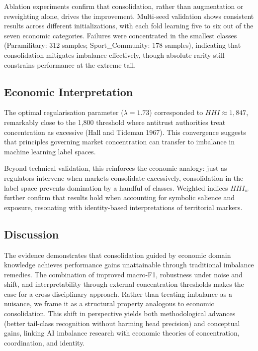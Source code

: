 \documentclass[
  a4paper,
]{article}
\begin{document}
Ablation experiments confirm that consolidation, rather than
augmentation or reweighting alone, drives the improvement. Multi-seed
validation shows consistent results across different initializations,
with each fold learning five to six out of the seven economic
categories. Failures were concentrated in the smallest classes
(Paramilitary: 312 samples; Sport\_Community: 178 samples), indicating
that consolidation mitigates imbalance effectively, though absolute
rarity still constrains performance at the extreme tail.

\subsection{Economic Interpretation}\label{economic-interpretation}

The optimal regularisation parameter (\(\lambda = 1.73\)) corresponded
to \(HHI \approx 1{,}847\), remarkably close to the 1,800 threshold
where antitrust authorities treat concentration as excessive (Hall and
Tideman 1967). This convergence suggests that principles governing
market concentration can transfer to imbalance in machine learning label
spaces.

Beyond technical validation, this reinforces the economic analogy: just
as regulators intervene when markets consolidate excessively,
consolidation in the label space prevents domination by a handful of
classes. Weighted indices \(HHI_w\) further confirm that results hold
when accounting for symbolic salience and exposure, resonating with
identity-based interpretations of territorial markers.

\subsection{Discussion}\label{discussion}

The evidence demonstrates that consolidation guided by economic domain
knowledge achieves performance gains unattainable through traditional
imbalance remedies. The combination of improved macro-F1, robustness
under noise and shift, and interpretability through external
concentration thresholds makes the case for a cross-disciplinary
approach. Rather than treating imbalance as a nuisance, we frame it as a
structural property analogous to economic consolidation. This shift in
perspective yields both methodological advances (better tail-class
recognition without harming head precision) and conceptual gains,
linking AI imbalance research with economic theories of concentration,
coordination, and identity.
\end{document}

